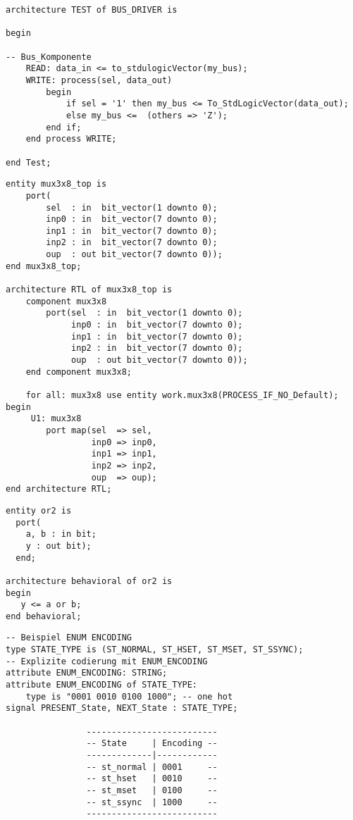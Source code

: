 \begin{minipage}{0.48\textwidth}
	\begin{lstlisting}[firstnumber=last]
architecture TEST of BUS_DRIVER is

begin
    
-- Bus_Komponente
	READ: data_in <= to_stdulogicVector(my_bus);
	WRITE: process(sel, data_out)
		begin
			if sel = '1' then my_bus <= To_StdLogicVector(data_out);
			else my_bus <= 	(others => 'Z');
		end if;
	end process WRITE;

end Test;	
	\end{lstlisting}
	\begin{lstlisting}
entity mux3x8_top is
	port(
		sel  : in  bit_vector(1 downto 0);
		inp0 : in  bit_vector(7 downto 0);
		inp1 : in  bit_vector(7 downto 0);
		inp2 : in  bit_vector(7 downto 0);
		oup  : out bit_vector(7 downto 0));
end mux3x8_top;

architecture RTL of mux3x8_top is
	component mux3x8
		port(sel  : in  bit_vector(1 downto 0);
			 inp0 : in  bit_vector(7 downto 0);
			 inp1 : in  bit_vector(7 downto 0);
			 inp2 : in  bit_vector(7 downto 0);
			 oup  : out bit_vector(7 downto 0));
	end component mux3x8;

	for all: mux3x8 use entity work.mux3x8(PROCESS_IF_NO_Default); 
begin
	 U1: mux3x8
	 	port map(sel  => sel,
	 		     inp0 => inp0,
	 		     inp1 => inp1,
	 		     inp2 => inp2,
	 		     oup  => oup);
end architecture RTL;	
	\end{lstlisting}
	\begin{lstlisting}
entity or2 is
  port(
    a, b : in bit;
    y : out bit);
  end;

architecture behavioral of or2 is
begin
   y <= a or b;
end behavioral;
	\end{lstlisting}
	\begin{lstlisting}
-- Beispiel ENUM ENCODING
type STATE_TYPE is (ST_NORMAL, ST_HSET, ST_MSET, ST_SSYNC);
-- Explizite codierung mit ENUM_ENCODING
attribute ENUM_ENCODING: STRING;
attribute ENUM_ENCODING of STATE_TYPE:
	type is "0001 0010 0100 1000"; -- one hot
signal PRESENT_State, NEXT_State : STATE_TYPE;

				--------------------------
				-- State     | Encoding --
				-------------|------------
				-- st_normal | 0001     --
				-- st_hset   | 0010     --
				-- st_mset   | 0100     --
				-- st_ssync  | 1000     --
				--------------------------
	\end{lstlisting}
\end{minipage}




